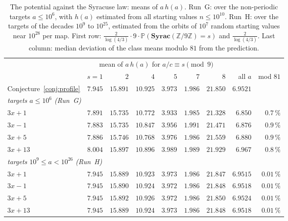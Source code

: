 \documentclass[12pt]{amsart}
\theoremstyle{definition}
\theoremstyle{remark}
\begin{document}
\begin{table}[htbp]
\centering
\small
\begin{tabular}{lrrrrrrrr}
\toprule
 & \multicolumn{6}{c}{mean of $a\,h(a)$ for $a/c\equiv s\pmod 9$} & & \\
\cmidrule(lr){2-7}
 & $s=1$ & $2$ & $4$ & $5$ & $7$ & $8$ & all $a$ & mod $81$ \\
\midrule
Conjecture~\ref{conj:profile} & $7.945$ & $15.891$ & $10.925$ & $3.973$ & $1.986$ & $21.850$ & $6.9521$ & \\
\midrule
\multicolumn{9}{l}{\emph{targets $a\le10^6$ (Run~G)}} \\
$3x+1$ & $7.891$ & $15.735$ & $10.772$ & $3.933$ & $1.985$ & $21.328$ & $6.850$ & $0.7\,\%$ \\
$3x-1$ & $7.883$ & $15.735$ & $10.847$ & $3.956$ & $1.991$ & $21.471$ & $6.876$ & $0.9\,\%$ \\
$3x+5$ & $7.886$ & $15.746$ & $10.768$ & $3.976$ & $1.986$ & $21.559$ & $6.880$ & $0.9\,\%$ \\
$3x+13$ & $8.004$ & $15.897$ & $10.896$ & $3.989$ & $1.989$ & $21.929$ & $6.967$ & $0.8\,\%$ \\
\midrule
\multicolumn{9}{l}{\emph{targets $10^9\le a<10^{26}$ (Run~H)}} \\
$3x+1$ & $7.945$ & $15.889$ & $10.923$ & $3.973$ & $1.986$ & $21.847$ & $6.9515$ & $0.01\,\%$ \\
$3x-1$ & $7.945$ & $15.890$ & $10.924$ & $3.972$ & $1.986$ & $21.848$ & $6.9518$ & $0.01\,\%$ \\
$3x+5$ & $7.945$ & $15.892$ & $10.926$ & $3.972$ & $1.986$ & $21.850$ & $6.9524$ & $0.01\,\%$ \\
$3x+13$ & $7.945$ & $15.889$ & $10.924$ & $3.973$ & $1.986$ & $21.848$ & $6.9518$ & $0.01\,\%$ \\
\bottomrule
\end{tabular}
\caption{The potential against the Syracuse law: means of $a\,h(a)$. Run~G: over the non-periodic targets $a\le10^6$, with $h(a)$ estimated from all starting values $n\le10^{10}$. Run~H: over the targets of the decades $10^9$ to $10^{25}$, estimated from the orbits of $10^7$ random starting values near $10^{28}$ per map. First row: $\tfrac{2}{\log(4/3)}\cdot9\cdot\mathbb P(\mathbf{Syrac}(\mathbb Z/9\mathbb Z)=s)$ and $\tfrac{2}{\log(4/3)}$. Last column: median deviation of the class means modulo $81$ from the prediction.}
\label{table:syracuse}
\end{table}
\end{document}
